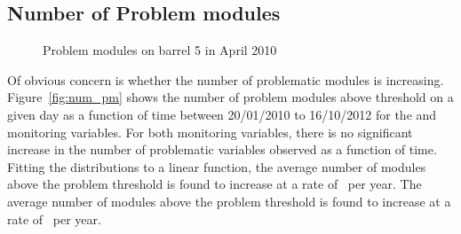 \subsection{Number of Problem modules}

\begin{figure}
	\centering


	\caption{Problem modules on barrel 5 in April 2010}
	\label{fig:pm_april}
\end{figure}
 
Of obvious concern is whether the number of problematic modules is increasing.
Figure~\ref{fig:num_pm} shows the number of problem modules above threshold on a
given day as a function of time between 20/01/2010 to 16/10/2012 for the \deltat
and \tdiff monitoring variables. For both monitoring variables, there is no
significant increase in the number of problematic variables observed as a
function of time. Fitting the distributions to a linear function, the average
number of \tdiff modules above the problem threshold is found to increase at a rate
of \NumHighTdiffModulesIncreaseRate\ per year. The average number of \deltat
modules above the problem threshold is found to increase at a rate of
\NumHighDeltaTModulesIncreaseRate\ per year.

